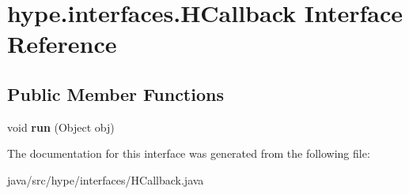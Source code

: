 \hypertarget{interfacehype_1_1interfaces_1_1_h_callback}{\section{hype.\-interfaces.\-H\-Callback Interface Reference}
\label{interfacehype_1_1interfaces_1_1_h_callback}
}
\subsection*{Public Member Functions}
\begin{DoxyCompactItemize}
\item 
\hypertarget{interfacehype_1_1interfaces_1_1_h_callback_a63ae124ee1991fedc1343b5cb2db41d2}{void {\bfseries run} (Object obj)}\label{interfacehype_1_1interfaces_1_1_h_callback_a63ae124ee1991fedc1343b5cb2db41d2}

\end{DoxyCompactItemize}


The documentation for this interface was generated from the following file\-:\begin{DoxyCompactItemize}
\item 
java/src/hype/interfaces/H\-Callback.\-java\end{DoxyCompactItemize}
